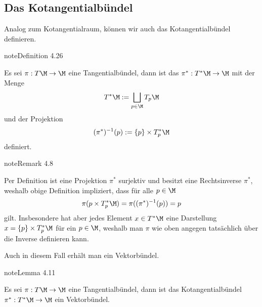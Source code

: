 \documentclass[letterpaper,10pt,german]{jupyterBook}
\begin{document}
\subsection{Das Kotangentialbündel}
\label{\detokenize{manifolds/tangential:das-kotangentialbundel}}\label{\detokenize{manifolds/tangential:s-kotangbundel}}
\sphinxAtStartPar
Analog zum Kotangentialraum, können wir auch das Kotangentialbündel definieren.
\label{manifolds/tangential:definition-34}
\begin{sphinxadmonition}{note}{Definition 4.26}



\sphinxAtStartPar
Es sei \(\pi:T\M\to\M\) eine Tangentialbündel, dann ist das  \(\pi^\ast: T^\ast\M\to\M\) mit der Menge
\begin{equation*}
\begin{split}T^\ast\M := \bigsqcup_{p\in\M} T_p\M\end{split}
\end{equation*}
\sphinxAtStartPar
und der Projektion
\begin{equation*}
\begin{split}(\pi^{\ast})^{-1}(p):= \{p\}\times T_p^\ast\M\end{split}
\end{equation*}
\sphinxAtStartPar
definiert.
\end{sphinxadmonition}
\label{manifolds/tangential:remark-35}
\begin{sphinxadmonition}{note}{Remark 4.8}



\sphinxAtStartPar
Per Definition ist eine Projektion \(\pi^\ast\) surjektiv und besitzt eine Rechtsinverse \(\pi^\ast\), weshalb obige Definition impliziert, dass für alle \(p\in\M\)
\begin{equation*}
\begin{split}\pi({p}\times T_p^\ast\M) = \pi((\pi^{\ast})^{-1}(p)) = p\end{split}
\end{equation*}
\sphinxAtStartPar
gilt. Insbesondere hat aber jedes Element \(x\in T^\ast\M\) eine Darstellung \(x=\{p\}\times T_p^\ast\M\) für ein \(p\in\M\), weshalb man \(\pi\) wie oben angegen tatsächlich über die Inverse definieren kann.
\end{sphinxadmonition}

\sphinxAtStartPar
Auch in diesem Fall erhält man ein Vektorbündel.
\label{manifolds/tangential:lemma-36}
\begin{sphinxadmonition}{note}{Lemma 4.11}



\sphinxAtStartPar
Es sei \(\pi:T\M\to\M\) eine Tangentialbündel, dann ist das Kotangentialbündel \(\pi^\ast:T^\ast\M\to\M\) ein Vektorbündel.
\end{sphinxadmonition}
\end{document}
